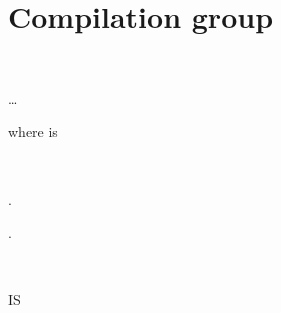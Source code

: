\chapter{Compilation group}

\begin{syntax}
  \begin{0-1}
     \\
  \end{0-1} \ldots
\end{syntax}

where  is

\begin{syntax}
  \begin{0-1}
    \begin{1=}
       \\
    \end{1=}
    .
  \end{0-1} \newline
  .
  \begin{1=}
     \\
    \miscext{\literal}
  \end{1=}
  \begin{0-1}  \literal \end{0-1}
  \begin{0-1} IS
    \begin{1=}
      \begin{1+}
         \\

        \begin{1=}
           \\
        \end{1=}
      \end{1+} \\


\end{1=}
\end{0-1}
\end{syntax}
